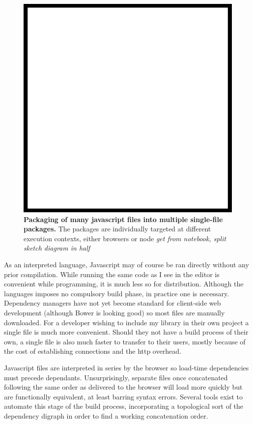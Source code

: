 \documentclass[]{article}
\makeatletter
\def\maxwidth{\ifdim\Gin@nat@width>\linewidth\linewidth
\else\Gin@nat@width\fi}
\let\Oldincludegraphics\includegraphics
\renewcommand{\includegraphics}[1]{\Oldincludegraphics[width=\maxwidth]{#1}}
\makeatother
\begin{document}
\begin{figure}[htbp]
\centering
\includegraphics{images/placeholder.png}
\caption{\textbf{Packaging of many javascript files into multiple
single-file packages.} The packages are individually targeted at
different execution contexts, either browsers or node \emph{get from
notebook, split sketch diagram in half}}
\end{figure}

As an interpreted language, Javascript may of course be ran directly
without any prior compilation. While running the same code as I see in
the editor is convenient while programming, it is much less so for
distribution. Although the languages imposes no compulsory build phase,
in practice one is necessary. Dependency managers have not yet become
standard for client-side web development (although Bower is looking
good) so most files are manually downloaded. For a developer wishing to
include my library in their own project a single file is much more
convenient. Should they not have a build process of their own, a single
file is also much faster to transfer to their users, mostly because of
the cost of establishing connections and the http overhead.

Javascript files are interpreted in series by the browser so load-time
dependencies must precede dependants. Unsurprisingly, separate files
once concatenated following the same order as delivered to the browser
will load more quickly but are functionally equivalent, at least barring
syntax errors. Several tools exist to automate this stage of the build
process, incorporating a topological sort of the dependency digraph in
order to find a working concatenation order.
\end{document}

